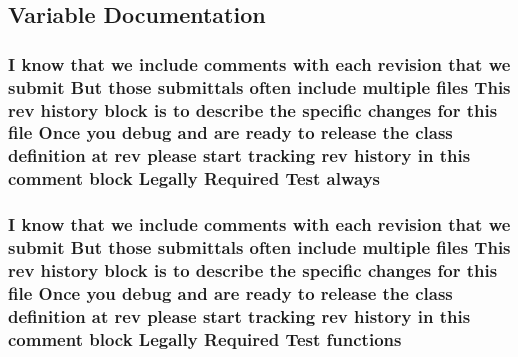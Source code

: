 \subsection{Variable Documentation}
\hypertarget{header__comment_8dox_ae06201b642d2041bfbc9e4441241ae3e}{
\subsubsection[{always}]{\setlength{\rightskip}{0pt plus 5cm}I know that we include comments with each revision that we submit But those submittals often include multiple files This rev history block is to describe the specific changes for this file Once you debug and are ready to release the class definition at rev please start tracking rev history in this comment block Legally Required {\bf Test} always}}\label{header__comment_8dox_ae06201b642d2041bfbc9e4441241ae3e}
\hypertarget{header__comment_8dox_a380ff23b583814c22c2de2b26c3b00d5}{
\subsubsection[{functions}]{\setlength{\rightskip}{0pt plus 5cm}I know that we include comments with each revision that we submit But those submittals often include multiple files This rev history block is to describe the specific changes for this file Once you debug and are ready to release the class definition at rev please start tracking rev history in this comment block Legally Required {\bf Test} functions}}\label{header__comment_8dox_a380ff23b583814c22c2de2b26c3b00d5}
